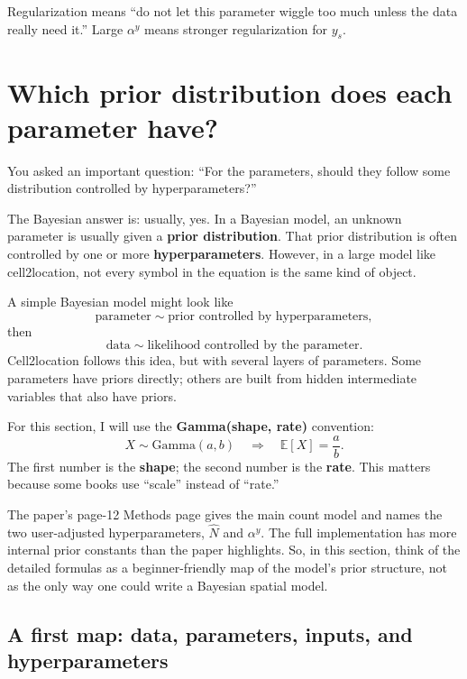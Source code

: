 \documentclass[11pt]{article}
\newcommand{\E}{\mathbb{E}}
\newcommand{\term}[1]{\textbf{#1}}
\begin{document}
\begin{warningbox}
Regularization means ``do not let this parameter wiggle too much unless the data really need it.'' Large $\alpha^y$ means stronger regularization for $y_s$.
\end{warningbox}

\section{Which prior distribution does each parameter have?}

You asked an important question: ``For the parameters, should they follow some distribution controlled by hyperparameters?''

The Bayesian answer is: usually, yes. In a Bayesian model, an unknown parameter is usually given a \term{prior distribution}. That prior distribution is often controlled by one or more \term{hyperparameters}. However, in a large model like cell2location, not every symbol in the equation is the same kind of object.

\begin{bigidea}
A simple Bayesian model might look like
\[
\text{parameter}\sim \text{prior controlled by hyperparameters},
\]
then
\[
\text{data}\sim \text{likelihood controlled by the parameter}.
\]
Cell2location follows this idea, but with several layers of parameters. Some parameters have priors directly; others are built from hidden intermediate variables that also have priors.
\end{bigidea}

For this section, I will use the \term{Gamma(shape, rate)} convention:
\[
X\sim \mathrm{Gamma}(a,b)
\quad\Longrightarrow\quad
\E[X]=\frac{a}{b}.
\]
The first number is the \term{shape}; the second number is the \term{rate}. This matters because some books use ``scale'' instead of ``rate.''

\begin{warningbox}
The paper's page-12 Methods page gives the main count model and names the two user-adjusted hyperparameters, $\hat N$ and $\alpha^y$. The full implementation has more internal prior constants than the paper highlights. So, in this section, think of the detailed formulas as a beginner-friendly map of the model's prior structure, not as the only way one could write a Bayesian spatial model.
\end{warningbox}

\subsection{A first map: data, parameters, inputs, and hyperparameters}
\end{document}
